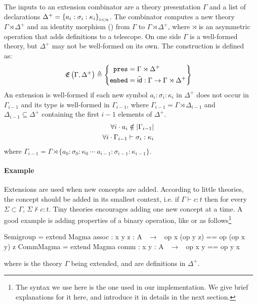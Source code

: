 The inputs to an extension combinator are a theory presentation $\Gamma$ and a list of declarations $\Delta^+ = \left\{a_{i}:\sigma_{i}:\kappa_{i}\right\}_{i<n}$. 
The combinator computes a new theory $\Gamma\rtimes\Delta^+$ and an identity morphism () from $\Gamma$ to $\Gamma\rtimes\Delta^+$, where $\rtimes$ is an asymmetric operation that adds definitions to a telescope. On one side $\Gamma$ is a well-formed theory, but $\Delta^+$ may not be well-formed on its own. 
The construction is defined as: 
\[\mathfrak{E}\left(\Gamma, \Delta^+\right) \triangleq \left\{ \begin{aligned} \mathtt{pres} & = \Gamma \rtimes \Delta^+ \\ \mathtt{embed} & = \tilde{\mathsf{id}} : \Gamma \rightarrow \Gamma \rtimes \Delta^+ \end{aligned}\right\}\]
An extension is well-formed if each new symbol $a_i:\sigma_{i}:\kappa_{i}$ in $\Delta^+$ does not occur in $\Gamma_{i-1}$ and its type is well-formed in $\Gamma_{i-1}$, 
where $\Gamma_{i-1} = \Gamma \rtimes \Delta_{i-1}$ and $\Delta_{i-1} \subseteq \Delta^+$ containing the first $i-1$ elements of $\Delta^+$.     
\begin{eqnarray*}
\forall i \cdot a_i \notin | \Gamma_{i-1} | \\
\forall i \cdot \Gamma_{i-1} \vdash \sigma_i : \kappa_{i}
\end{eqnarray*}
where $\Gamma_{i-1} = \Gamma \rtimes \{a_0 : \sigma_0 : \kappa_0\  \cdots \ a_{i-1} : \sigma_{i-1} : \kappa_{i-1}\}$.  


\paragraph{Example}
Extensions are used when new concepts are added. According to little theories, the concept should be added in its smallest context, i.e. if $\Gamma \vdash c : t$ then for every $\Sigma \subset \Gamma$, $\Sigma \nvdash c : t$. Tiny theories encourages adding one new concept at a time. A good example is adding properties of a binary operation, like  or  as follows\footnote{The syntax we use here is the one used in our implementation. We give brief explanations for it here, and introduce it in details in the next section.} 
\begin{togcode}
Semigroup = 
  extend Magma {assoc : {x y z : A} ~$\to$~ op x (op y z) == op (op x y) z} 
CommMagma = 
  extend Magma {comm  : {x y : A} ~$\to$~ op x y == op y x}
\end{togcode} 
\noindent where  is the theory $\Gamma$ being extended,  and  are definitions in $\Delta^+$. 

